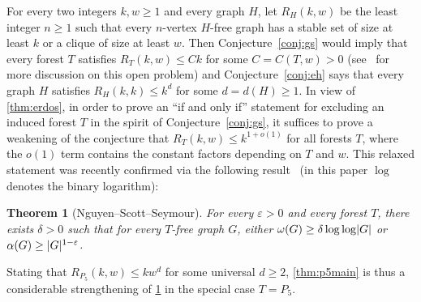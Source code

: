 \documentclass[11pt,reqno]{amsart}
\newtheorem{theorem}{Theorem}[section]
\newcommand{\dd}{\textquotedblleft}
\newcommand{\ee}{\textquotedblright}
\newcommand{\eps}{\varepsilon}
\DeclarePairedDelimiter\abs{\lvert}{\rvert}%
\begin{document}
	For every two integers $k,w\ge1$ and every graph $H$, let $R_H(k,w)$ be the least integer $n\ge1$ such that every $n$-vertex $H$-free graph has a stable set of size at least $k$ or a clique of size at least $w$.
	Then Conjecture~\ref{conj:gs} would imply that every forest $T$ satisfies $R_T(k,w)\le Ck$ for some $C=C(T,w)>0$ (see~\cite{stable1} for more discussion on this open problem) and Conjecture~\ref{conj:eh} says that every graph $H$ satisfies $R_H(k,k)\le k^d$ for some $d=d(H)\ge1$.
	In view of \cref{thm:erdos}, in order to prove an \dd if and only if\ee{} statement for excluding an induced forest $T$ in the spirit of Conjecture~\ref{conj:gs},
	it suffices to prove a weakening of the conjecture that $R_T(k,w)\le k^{1+o(1)}$ for all forests $T$, where the $o(1)$ term contains the constant factors depending on $T$ and $w$.
	This relaxed statement was recently confirmed via the following result~\cite{stable1} (in this paper $\log$ denotes the binary logarithm):
	\begin{theorem}
		[Nguyen--Scott--Seymour]
		\label{thm:trees}
		For every $\eps>0$ and every forest $T$, there exists $\delta>0$ such that for every $T$-free graph $G$, either $\omega(G)\ge \delta\log\log\abs G$ or $\alpha(G)\ge\abs G^{1-\eps}$.
	\end{theorem}
	Stating that $R_{P_5}(k,w)\le kw^d$ for some universal $d\ge2$, \cref{thm:p5main} is thus a considerable strengthening of \cref{thm:trees} in the special case $T=P_5$.
	
\end{document}
